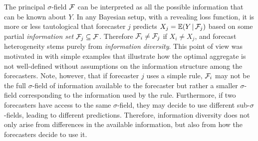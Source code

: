 \documentclass[11pt]{article}
\newcommand{\E}{\mathbb{E}}
\theoremstyle{definition}
\theoremstyle{definition}
\def\F{{\cal F}}
\def\G{{\cal G}}
\def\E{{\mathbb E}}
\def\|{\, | \,}
\begin{document}
The principal $\sigma$-field $\F$ can be interpreted as all the possible information that can be known about $Y$. 
In any Bayesian setup, with a revealing loss function, it is more or less tautological that
forecaster $j$ predicts $X_j = \E(Y \| \F_j)$ based on some partial \textit{information set} $\F_j \subseteq \F$. Therefore $\F_i \neq \F_j$ if $X_i \neq X_j$, and forecast heterogeneity stems purely from \textit{information diversity}. This point of view was motivated in \cite{satopaamodeling} with simple examples that illustrate how the optimal aggregate is not well-defined without assumptions on the information structure among the forecasters. Note, however, that if forecaster $j$ uses a simple rule, $\F_i$ may not be the full $\sigma$-field of information available to the forecaster but rather a smaller $\sigma$-field corresponding to the information used by the rule. Furthermore, if two forecasters have access to the same $\sigma$-field, they may decide to use different sub-$\sigma$-fields, leading to different predictions. 
Therefore,
information diversity does not only arise from differences in the available information, but also from how the forecasters decide to use it. 
\end{document}

